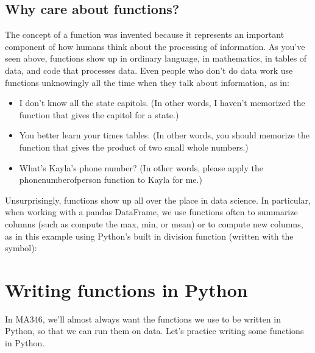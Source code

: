 \documentclass[letterpaper,10pt,english]{jupyterBook}
\begin{document}
\subsection{Why care about functions?}
\label{\detokenize{chapter-2-mathematical-foundations:why-care-about-functions}}
\sphinxAtStartPar
The concept of a function was invented because it represents an important component of how humans think about the processing of information.  As you’ve seen above, functions show up in ordinary language, in mathematics, in tables of data, and code that processes data.  Even people who don’t do data work use functions unknowingly all the time when they talk about information, as in:
\begin{itemize}
\item {} 
\sphinxAtStartPar
I don’t know all the state capitols. (In other words, I haven’t memorized the function that gives the capitol for a state.)

\item {} 
\sphinxAtStartPar
You better learn your times tables. (In other words, you should memorize the function that gives the product of two small whole numbers.)

\item {} 
\sphinxAtStartPar
What’s Kayla’s phone number? (In other words, please apply the phone\sphinxhyphen{}number\sphinxhyphen{}of\sphinxhyphen{}person function to Kayla for me.)

\end{itemize}

\sphinxAtStartPar
Unsurprisingly, functions show up all over the place in data science.  In particular, when working with a pandas DataFrame, we use functions often to summarize columns (such as compute the max, min, or mean) or to compute new columns, as in this example using Python’s built in division function (written with the \sphinxcode{\sphinxupquote{/}} symbol):

\begin{sphinxVerbatim}[commandchars=\\\{\}]
\PYG{p}{[}\PYG{p}{]}  \PYG{p}{[}\PYG{p}{]}  \PYG{p}{[}\PYG{p}{]}
\end{sphinxVerbatim}


\section{Writing functions in Python}
\label{\detokenize{chapter-2-mathematical-foundations:writing-functions-in-python}}
\sphinxAtStartPar
In MA346, we’ll almost always want the functions we use to be written in Python, so that we can run them on data.  Let’s practice writing some functions in Python.
\end{document}
